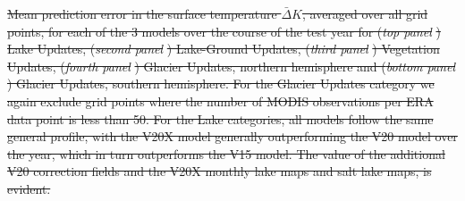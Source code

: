 \documentclass[hess, twostagejnl]{copernicus}
\providecommand{\DIFdel}[1]{{\protect\color{red}\sout{#1}}}                      %
\providecommand{\DIFdelbegin}{} %
\providecommand{\DIFdelend}{} %
\providecommand{\DIFdelFL}[1]{\DIFdel{#1}} %
\begin{document}
\DIFdelbegin %
{%
\DIFdelFL{Mean prediction error in the surface temperature $\bar{\Delta} K$, averaged over all grid points, for each of the 3 models over the course of the test year for (}\textit{\DIFdelFL{top panel}}%
\DIFdelFL{) Lake Updates, (}\textit{\DIFdelFL{second panel}}%
\DIFdelFL{) Lake-Ground Updates, (}\textit{\DIFdelFL{third panel}}%
\DIFdelFL{) Vegetation Updates, (}\textit{\DIFdelFL{fourth panel}}%
\DIFdelFL{) Glacier Updates, northern hemisphere and (}\textit{\DIFdelFL{bottom panel}}%
\DIFdelFL{) Glacier Updates, southern hemisphere. For the Glacier Updates category we again exclude grid points where the number of MODIS observations per ERA data point is less than 50.  For the Lake categories, all models follow the same general profile, with the V20X model generally outperforming the V20 model over the year, which in turn outperforms the V15 model. The value of the additional V20 correction fields and the V20X monthly lake maps and salt lake maps, is evident.}}
\DIFdelend 
\end{document}
